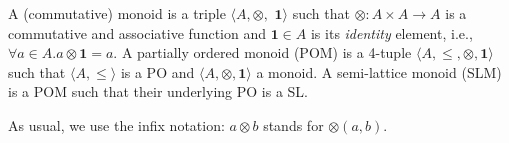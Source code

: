 \documentclass{llncs}
\def\1{{\mathbf 1}}
\newcommand{\comment}[1]{}
\def\monid{{\mathbf 0}}
\def\1{{\mathbf 1}}
\def\monop{\otimes}
\def\monid{\mathbf{1}}
\begin{document}
%



%
%

\begin{definition}\label{defn:clm}
	A (commutative) monoid is a triple
	$\langle A, \monop,$ $\1 \rangle$ such that $\monop: A \times A \rightarrow A$ is
	a commutative and associative function and $\1 \in A$ is its \emph{identity} element,
	i.e., $\forall a \in A. a \monop \1 = a$.
%	
	A partially ordered monoid (POM) is a 4-tuple
	$\langle A, \leq, \monop, \1 \rangle$ such that 	
	$\langle A, \leq \rangle$ is a PO and $\langle A, \monop, \1 \rangle$ a monoid.
	A semi-lattice monoid (SLM) is a 
	POM such that their underlying PO is a SL.
\end{definition}

As usual, we use the infix notation: $a \monop b$ stands for $\monop(a,b)$.
\comment{The monoidal operator can be defined for any multi-set: it is given 
for a family of elements $a_i \in A$ indexed over a non-empty finite
set $I$, and it is denoted by
$\bigotimes_{i \in I} a_i$.
%
If for an index set $I$ the $a_i$'s are different,
we write $\bigotimes S$ instead of $\bigotimes_{i \in I} a_i$
for the set $S = \{a_i \mid i \in I\}$.
%
Conventionally, we denote $\bigotimes \emptyset = \bot$.
}
\end{document}
